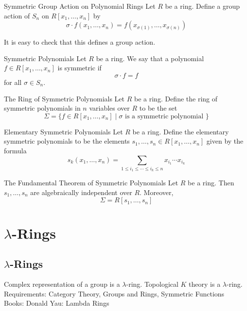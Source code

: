 \documentclass[a4paper]{article}
\begin{document}
\begin{defn}{Symmetric Group Action on Polynomial Rings}{} Let $R$ be a ring. Define a group action of $S_n$ on $R[x_1,\dots,x_n]$ by $$\sigma\cdot f(x_1,\dots,x_n)=f(x_{\sigma(1)},\dots,x_{\sigma(n)})$$
\end{defn}

It is easy to check that this defines a group action. 

\begin{defn}{Symmetric Polynomials}{} Let $R$ be a ring. We say that a polynomial $f\in R[x_1,\dots,x_n]$ is symmetric if $$\sigma\cdot f=f$$ for all $\sigma\in S_n$. 
\end{defn}

\begin{defn}{The Ring of Symmetric Polynomials}{} Let $R$ be a ring. Define the ring of symmetric polynomials in $n$ variables over $R$ to be the set $$\Sigma=\{f\in R[x_1,\dots,x_n]\;|\;\sigma\text{ is a symmetric polynomial }\}$$
\end{defn}

\begin{defn}{Elementary Symmetric Polynomials}{} Let $R$ be a ring. Define the elementary symmetric polynomials to be the elements $s_1,\dots,s_n\in R[x_1,\dots,x_n]$ given by the formula $$s_k(x_1,\dots,x_n)=\sum_{1\leq i_1\leq\cdots\leq i_k\leq n}x_{i_1}\cdots x_{i_k}$$
\end{defn}

\begin{thm}{The Fundamental Theorem of Symmetric Polynomials}{} Let $R$ be a ring. Then $s_1,\dots,s_n$ are algebraically independent over $R$. Moreover, $$\Sigma=R[s_1,\dots,s_n]$$
\end{thm}

\pagebreak
\section{$\lambda$-Rings}
\subsection{$\lambda$-Rings}
Complex representation of a group is a $\lambda$-ring. Topological $K$ theory is a $\lambda$-ring. \\

Requirements: Category Theory, Groups and Rings, Symmetric Functions\\
Books: Donald Yau: Lambda Rings\\
\end{document}
